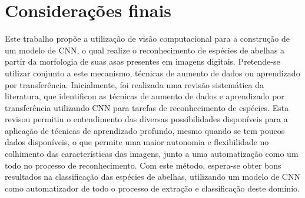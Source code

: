\documentclass[
	12pt,				%
	oneside,			%
	a4paper,			%
	english,			%
	brazil				%
	]{abntex2ppgsi}
\begin{document}
\chapter{Considerações finais}
Este trabalho propõe a utilização de visão computacional para a construção de um modelo de CNN, o qual realize o reconhecimento de espécies de abelhas a partir da morfologia de suas asas presentes em imagens digitais. Pretende-se utilizar conjunto a este mecanismo, técnicas de aumento de dados ou aprendizado por transferência. Inicialmente, foi realizada uma revisão sistemática da literatura, que identificou as técnicas de aumento de dados e aprendizado por transferência utilizando CNN para tarefas de reconhecimento de espécies. Esta revisou permitiu o entendimento das diversas possibilidades disponíveis para a aplicação de técnicas de aprendizado profundo, mesmo quando se tem poucos dados disponíveis, o que permite uma maior autonomia e flexibilidade no colhimento das características das imagens, junto a uma automatização como um todo no processo de reconhecimento. Com este método, espera-se obter bons resultados na classificação das espécies de abelhas, utilizando um modelo de CNN como automatizador de todo o processo de extração e classificação deste domínio.

\postextual



%
%




%
%
%
\end{document}
